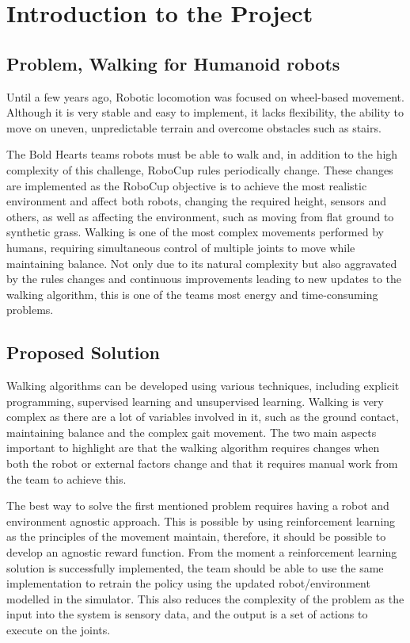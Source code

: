  \section{Introduction to the Project}

 \subsection{Problem, Walking for Humanoid robots}
 Until a few years ago, Robotic locomotion was focused on wheel-based movement. Although it is very stable and easy to implement, it lacks flexibility, the ability to move on uneven, unpredictable terrain and overcome obstacles such as stairs.

 The Bold Hearts teams robots must be able to walk and, in addition to the high complexity of this challenge, RoboCup rules periodically change. 
 These changes are implemented as the RoboCup objective is to achieve the most realistic environment and affect both robots, changing the required height, sensors and others, as well as affecting the environment, 
 such as moving from flat ground to synthetic grass. Walking is one of the most complex movements performed by humans, requiring simultaneous control of multiple joints to move while maintaining balance. 
 Not only due to its natural complexity but also aggravated by the rules changes and continuous improvements leading to new updates to the walking algorithm, this is one of the teams most energy and time-consuming problems.
 \subsection{Proposed Solution}

 Walking algorithms can be developed using various techniques, 
 including explicit programming, supervised learning and unsupervised learning. 
 Walking is very complex as there are a lot of variables involved in it, such as the ground contact, 
 maintaining balance and the complex gait movement. The two main aspects important to highlight are that the walking algorithm requires changes when both the robot or external factors change and that it requires manual work from the team to achieve this. 

 The best way to solve the first mentioned problem requires having a robot and environment agnostic approach. This is possible by using reinforcement learning as the principles of the movement maintain, therefore, it should be possible to develop an agnostic reward function.
 From the moment a reinforcement learning solution is successfully implemented, the team should be able to use the same implementation to retrain the policy using the updated robot/environment modelled in the simulator.
 This also reduces the complexity of the problem as the input into the system is sensory data, and the output is a set of actions to execute on the joints.

